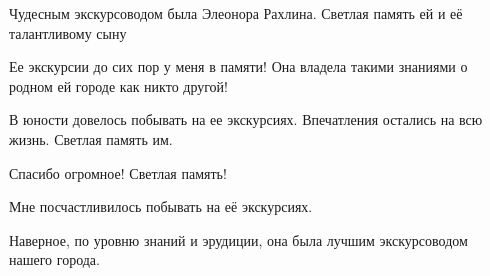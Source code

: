  
 
 
 
 

Чудесным экскурсоводом была Элеонора Рахлина. Светлая память ей и её талантливому сыну

Ее экскурсии до сих пор у меня в памяти! Она владела такими знаниями о родном ей городе как никто другой!

В юности довелось побывать на ее экскурсиях. Впечатления остались на всю жизнь. Светлая память им.

Спасибо огромное!
Светлая память!

Мне посчастливилось побывать на её экскурсиях.

Наверное, по уровню знаний и эрудиции, она была лучшим экскурсоводом нашего города.

